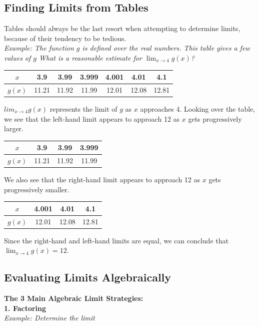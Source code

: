    \subsection{Finding Limits from Tables}
        Tables should always be the last resort when attempting to determine limits, because
        of their tendency to be tedious. \\

        \noindent \color{blue} \textit{Example: The function $g$ is defined over the real numbers.
        This table gives a few values of $g$ What is a reasonable estimate for $\lim_{x\to 4}g(x)$?}
        \color{black} \\

        \begin{tabular}{ccccccc}
            $x$ & 3.9 & 3.99 & 3.999 & 4.001 & 4.01 & 4.1 \\
            \hline
            $g(x)$ & 11.21 & 11.92 & 11.99 & 12.01 & 12.08 & 12.81
        \end{tabular}

        \noindent $lim_{x\to 4}g(x)$ represents the limit of $g$ as $x$ approaches
        4. Looking over the table, we see that the left-hand limit appears to approach 12 as
        $x$ gets progressively larger. \\

        \begin{tabular}{cccc}
            $x$ & 3.9 & 3.99 & 3.999 \\
            \hline
            $g(x)$ & 11.21 & 11.92 & 11.99
        \end{tabular}

        \noindent We also see that the right-hand limit appears to approach 12 as $x$ gets
        progressively smaller. \\

        \begin{tabular}{cccc}
            $x$ & 4.001 & 4.01 & 4.1 \\
            \hline
            $g(x)$ & 12.01 & 12.08 & 12.81
        \end{tabular}

        \noindent Since the right-hand and left-hand limits are equal, we can conclude
        that $\lim_{x\to 4}g(x)=12$.



    \subsection{Evaluating Limits Algebraically}
        \color{purple} \textbf{The 3 Main Algebraic Limit Strategies:} \color{black} \\
        \noindent \color{purple} \textbf{1. Factoring} \color{blue} \\
        \textit{Example: Determine the limit} \color{black} \\

